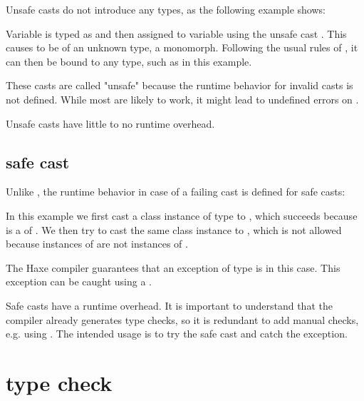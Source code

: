 Unsafe casts do not introduce any  types, as the following example shows:


Variable  is typed as  and then assigned to variable  using the unsafe cast . This causes  to be of an unknown type, a monomorph. Following the usual rules of , it can then be bound to any type, such as  in this example.

These casts are called "unsafe" because the runtime behavior for invalid casts is not defined. While most  are likely to work, it might lead to undefined errors on .

Unsafe casts have little to no runtime overhead.

\subsection{safe cast}
\label{expression-cast-safe}

Unlike , the runtime behavior in case of a failing cast is defined for safe casts:


In this example we first cast a class instance of type  to , which succeeds because  is a  of . We then try to cast the same class instance to , which is not allowed because instances of  are not instances of .

The Haxe compiler guarantees that an exception of type  is  in this case. This exception can be caught using a .

Safe casts have a runtime overhead. It is important to understand that the compiler already generates type checks, so it is redundant to add manual checks, e.g. using . The intended usage is to try the safe cast and catch the  exception.


\section{type check}
\label{expression-type-check}

